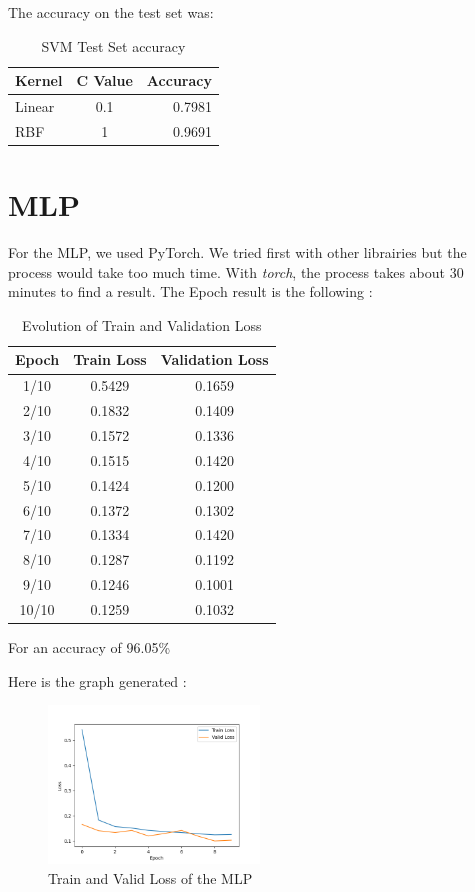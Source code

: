 \documentclass{article}
\begin{document}
The accuracy on the test set was:
\begin{table}[H]
\centering
\begin{tabular}{l|c|r}
Kernel & C Value & Accuracy \\\hline
Linear & 0.1 & 0.7981 \\
RBF & 1 & 0.9691 \\
\end{tabular}
\caption{SVM Test Set accuracy}
\end{table}

\section{MLP}

For the MLP, we used PyTorch. We tried first with other librairies but the process would take too much time. With \textit{torch}, the process takes about 30 minutes to find a result.
The Epoch result is the following : 
\begin{table}[h]
    \centering
    \begin{tabular}{|c|c|c|}
        \hline
        Epoch & Train Loss & Validation Loss\\
        \hline
        1/10 & 0.5429 & 0.1659 \\
        2/10 & 0.1832 & 0.1409 \\
        3/10 & 0.1572 & 0.1336 \\
        4/10 & 0.1515 & 0.1420 \\
        5/10 & 0.1424 & 0.1200 \\
        6/10 & 0.1372 & 0.1302 \\
        7/10 & 0.1334 & 0.1420 \\
        8/10 & 0.1287 & 0.1192 \\
        9/10 & 0.1246 & 0.1001 \\
        10/10 & 0.1259 & 0.1032 \\
        \hline
    \end{tabular}
    \caption{Evolution of Train and Validation Loss}
    \label{tab:Loss}
\end{table}

For an accuracy of 96.05\%

Here is the graph generated : 
\begin{figure}[h]
    \centering
    \includegraphics[width=0.5\textwidth]{Figures/MLP_TrainLoss_ValidLoss.png}
    \caption{Train and Valid Loss of the MLP}
    \label{fig:TrainValidLoss_MLP}
\end{figure}
\end{document}
